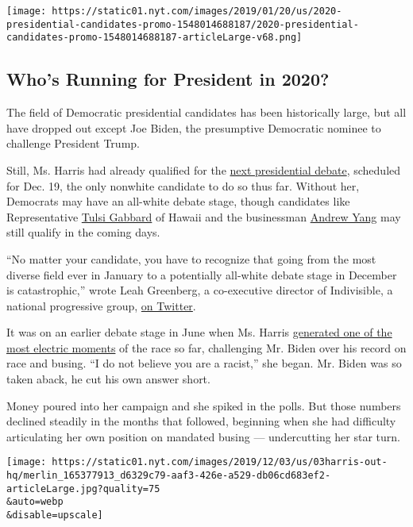 \texttt{[image: https://static01.nyt.com/images/2019/01/20/us/2020-presidential-candidates-promo-1548014688187/2020-presidential-candidates-promo-1548014688187-articleLarge-v68.png]}

\hypertarget{whos-running-for-president-in-2020}{%
\subsection{Who's Running for President in
2020?}\label{whos-running-for-president-in-2020}}

The field of Democratic presidential candidates has been historically
large, but all have dropped out except Joe Biden, the presumptive
Democratic nominee to challenge President Trump.

Still, Ms. Harris had already qualified for the
\href{https://www.nytimes.com/interactive/2019/us/politics/democratic-debate-lineup.html}{next
presidential debate}, scheduled for Dec. 19, the only nonwhite candidate
to do so thus far. Without her, Democrats may have an all-white debate
stage, though candidates like Representative
\href{https://www.nytimes.com/interactive/2020/us/elections/tulsi-gabbard.html}{Tulsi
Gabbard} of Hawaii and the businessman
\href{https://www.nytimes.com/interactive/2020/us/elections/andrew-yang.html}{Andrew
Yang} may still qualify in the coming days.

``No matter your candidate, you have to recognize that going from the
most diverse field ever in January to a potentially all-white debate
stage in December is catastrophic,'' wrote Leah Greenberg, a
co-executive director of Indivisible, a national progressive group,
\href{https://twitter.com/Leahgreenb/status/1201934660789510144}{on
Twitter}.

It was on an earlier debate stage in June when Ms. Harris
\href{https://www.nytimes.com/2019/06/27/us/politics/kamala-harris-busing-joe-biden.html}{generated
one of the most electric moments} of the race so far, challenging Mr.
Biden over his record on race and busing. ``I do not believe you are a
racist,'' she began. Mr. Biden was so taken aback, he cut his own answer
short.

Money poured into her campaign and she spiked in the polls. But those
numbers declined steadily in the months that followed, beginning when
she had difficulty articulating her own position on mandated busing ---
undercutting her star turn.

\texttt{[image: https://static01.nyt.com/images/2019/12/03/us/03harris-out-hq/merlin\_165377913\_d6329c79-aaf3-426e-a529-db06cd683ef2-articleLarge.jpg?quality=75\\\&auto=webp\\\&disable=upscale]}

